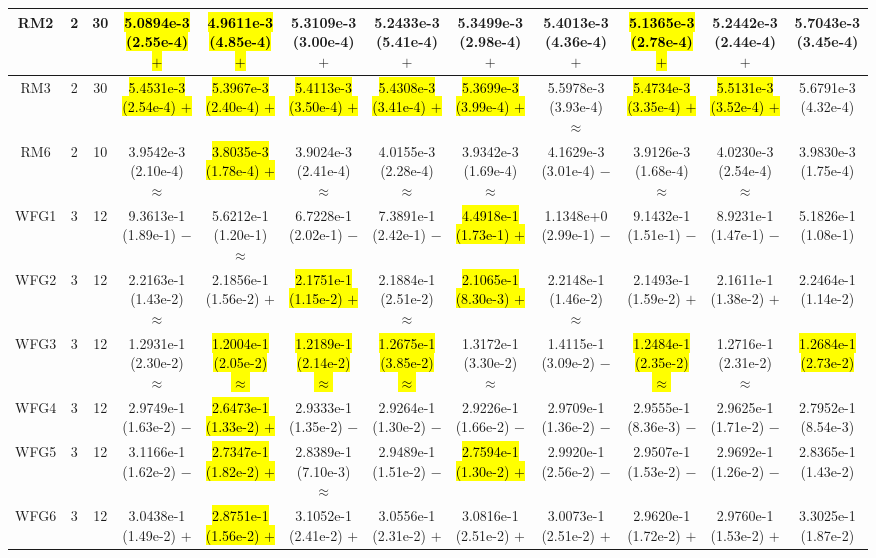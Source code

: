 \documentclass[journal]{IEEEtran}
\begin{document}
\begin{table*}[htbp]
\begin{tabular}{cccccccccccc}
\hline
\multirow{1}{*}{RM2}&2&30&\hl{5.0894e-3 (2.55e-4) $+$}&\hl{4.9611e-3 (4.85e-4) $+$}&5.3109e-3 (3.00e-4) $+$&5.2433e-3 (5.41e-4) $+$&5.3499e-3 (2.98e-4) $+$&5.4013e-3 (4.36e-4) $+$&\hl{5.1365e-3 (2.78e-4) $+$}&5.2442e-3 (2.44e-4) $+$&5.7043e-3 (3.45e-4)\\
\hline
\multirow{1}{*}{RM3}&2&30&\hl{5.4531e-3 (2.54e-4) $+$}&\hl{5.3967e-3 (2.40e-4) $+$}&\hl{5.4113e-3 (3.50e-4) $+$}&\hl{5.4308e-3 (3.41e-4) $+$}&\hl{5.3699e-3 (3.99e-4) $+$}&5.5978e-3 (3.93e-4) $\approx$&\hl{5.4734e-3 (3.35e-4) $+$}&\hl{5.5131e-3 (3.52e-4) $+$}&5.6791e-3 (4.32e-4)\\
\hline
\multirow{1}{*}{RM6}&2&10&3.9542e-3 (2.10e-4) $\approx$&\hl{3.8035e-3 (1.78e-4) $+$}&3.9024e-3 (2.41e-4) $\approx$&4.0155e-3 (2.28e-4) $\approx$&3.9342e-3 (1.69e-4) $\approx$&4.1629e-3 (3.01e-4) $-$&3.9126e-3 (1.68e-4) $\approx$&4.0230e-3 (2.54e-4) $\approx$&3.9830e-3 (1.75e-4)\\
\hline
\multirow{1}{*}{WFG1}&3&12&9.3613e-1 (1.89e-1) $-$&5.6212e-1 (1.20e-1) $\approx$&6.7228e-1 (2.02e-1) $-$&7.3891e-1 (2.42e-1) $-$&\hl{4.4918e-1 (1.73e-1) $+$}&1.1348e+0 (2.99e-1) $-$&9.1432e-1 (1.51e-1) $-$&8.9231e-1 (1.47e-1) $-$&5.1826e-1 (1.08e-1)\\
\hline
\multirow{1}{*}{WFG2}&3&12&2.2163e-1 (1.43e-2) $\approx$&2.1856e-1 (1.56e-2) $+$&\hl{2.1751e-1 (1.15e-2) $+$}&2.1884e-1 (2.51e-2) $\approx$&\hl{2.1065e-1 (8.30e-3) $+$}&2.2148e-1 (1.46e-2) $\approx$&2.1493e-1 (1.59e-2) $+$&2.1611e-1 (1.38e-2) $+$&2.2464e-1 (1.14e-2)\\
\hline
\multirow{1}{*}{WFG3}&3&12&1.2931e-1 (2.30e-2) $\approx$&\hl{1.2004e-1 (2.05e-2) $\approx$}&\hl{1.2189e-1 (2.14e-2) $\approx$}&\hl{1.2675e-1 (3.85e-2) $\approx$}&1.3172e-1 (3.30e-2) $\approx$&1.4115e-1 (3.09e-2) $-$&\hl{1.2484e-1 (2.35e-2) $\approx$}&1.2716e-1 (2.31e-2) $\approx$&\hl{1.2684e-1 (2.73e-2)}\\
\hline
\multirow{1}{*}{WFG4}&3&12&2.9749e-1 (1.63e-2) $-$&\hl{2.6473e-1 (1.33e-2) $+$}&2.9333e-1 (1.35e-2) $-$&2.9264e-1 (1.30e-2) $-$&2.9226e-1 (1.66e-2) $-$&2.9709e-1 (1.36e-2) $-$&2.9555e-1 (8.36e-3) $-$&2.9625e-1 (1.71e-2) $-$&2.7952e-1 (8.54e-3)\\
\hline
\multirow{1}{*}{WFG5}&3&12&3.1166e-1 (1.62e-2) $-$&\hl{2.7347e-1 (1.82e-2) $+$}&2.8389e-1 (7.10e-3) $\approx$&2.9489e-1 (1.51e-2) $-$&\hl{2.7594e-1 (1.30e-2) $+$}&2.9920e-1 (2.56e-2) $-$&2.9507e-1 (1.53e-2) $-$&2.9692e-1 (1.26e-2) $-$&2.8365e-1 (1.43e-2)\\
\hline
\multirow{1}{*}{WFG6}&3&12&3.0438e-1 (1.49e-2) $+$&\hl{2.8751e-1 (1.56e-2) $+$}&3.1052e-1 (2.41e-2) $+$&3.0556e-1 (2.31e-2) $+$&3.0816e-1 (2.51e-2) $+$&3.0073e-1 (2.51e-2) $+$&2.9620e-1 (1.72e-2) $+$&2.9760e-1 (1.53e-2) $+$&3.3025e-1 (1.87e-2)\\

\end{tabular}
\end{table*}
\end{document}
